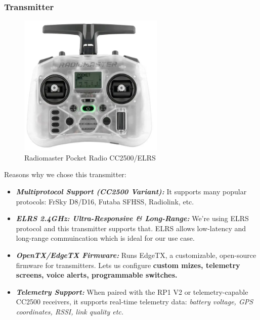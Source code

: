\documentclass[12pt]{report}
\begin{document}
        \subsubsection{\large Transmitter}
        \begin{figure}
          \includegraphics[width=1\linewidth]{transmitter.png}
          \caption{Radiomaster Pocket Radio CC2500/ELRS}
          \label{fig:transmitter}
        \end{figure}
        Reasons why we chose this transmitter:
        \begin{itemize}
          \item \textbf{\textit{Multiprotocol Support (CC2500 Variant):}} It supports many popular protocols: FrSky D8/D16, Futaba SFHSS, Radiolink, etc.
          \item \textbf{\textit{ELRS 2.4GHz: Ultra-Responsive \& Long-Range:}} We're using ELRS protocol and this transmitter supports that. ELRS allows low-latency and long-range commuincation which is ideal for our use case.
          \item \textbf{\textit{OpenTX/EdgeTX Firmware:}} Runs EdgeTX, a customizable, open-source firmware for transmitters. Lets us configure \textbf{custom mizes, telemetry screens, voice alerts, programmable switches.}
          \item \textbf{\textit{Telemetry Support:}} When paired with the RP1 V2 or telemetry-capable CC2500 receivers, it supports real-time telemetry data: \textit{battery voltage, GPS coordinates, RSSI, link quality etc.}
        \end{itemize}
\end{document}

